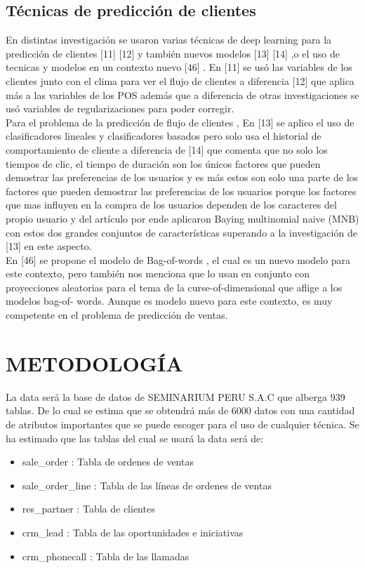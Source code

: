 \documentclass[conference]{IEEEtran}
\begin{document}
\subsection{Técnicas de predicción de clientes}

En distintas investigación se usaron varias técnicas de deep learning para la
predicción de clientes [11] [12] y también nuevos modelos [13] [14] ,o el uso de
tecnicas y modelos en un contexto nuevo [46] .
En [11] se usó las variables de los clientes junto con el clima para ver el flujo de
clientes a diferencia [12] que aplica más a las variables de los POS además que a
diferencia de otras investigaciones se usó variables de regularizaciones para poder
corregir.\\

Para el problema de la predicción de flujo de clientes , En [13] se aplico el uso de
clasificadores lineales y clasificadores basados pero solo usa el historial de
comportamiento de cliente a diferencia de [14] que comenta que no solo los tiempos
de clic, el tiempo de duración son los únicos factores que pueden demostrar las
preferencias de los usuarios y es más estos son solo una parte de los factores que
pueden demostrar las preferencias de los usuarios porque los factores que mas
influyen en la compra de los usuarios dependen de los caracteres del propio usuario
y del artículo por ende aplicaron Baying multinomial naive (MNB) con estos dos
grandes conjuntos de características superando a la investigación de [13] en este
aspecto.\\
En [46] se propone el modelo de Bag-of-words , el cual es un nuevo modelo para
este contexto, pero también nos menciona que lo usan en conjunto con proyecciones
aleatorias para el tema de la curse-of-dimensional que aflige a los modelos bag-of-
words. Aunque es modelo nuevo para este contexto, es muy competente en el
problema de predicción de ventas.

\section{METODOLOGÍA}
La data será la base de datos de SEMINARIUM PERU S.A.C que alberga 939
tablas. De lo cual se estima que se obtendrá más de 6000 datos con una cantidad de
atributos importantes que se puede escoger para el uso de cualquier técnica.
Se ha estimado que las tablas del cual se usará la data será de:
\begin{itemize}
    \item sale\_order : Tabla de ordenes de ventas
    \item sale\_order\_line : Tabla de las líneas de ordenes de ventas
    \item res\_partner : Tabla de clientes
    \item crm\_lead : Tabla de las oportunidades e iniciativas
    \item crm\_phonecall : Tabla de las llamadas
\end{itemize}
\end{document}
